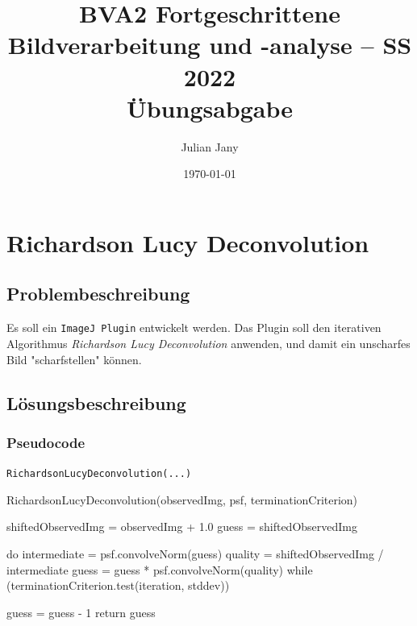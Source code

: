 \documentclass[german,notitlepage,smartquotes]{hgbreport}
\author{Julian Jany}                        %
\title{BVA2 Fortgeschrittene Bildverarbeitung und -analyse -- SS 2022\\ %
				Übungsabgabe \arabic{chapter}}
\date{\today}
\begin{document}
\maketitle





\section{Richardson Lucy Deconvolution}

\subsection{Problembeschreibung}

Es soll ein \texttt{ImageJ Plugin} entwickelt werden. 
Das Plugin soll den iterativen Algorithmus \textit{Richardson Lucy Deconvolution} anwenden, und damit ein \zB unscharfes Bild "scharfstellen" können.

\subsection{Lösungsbeschreibung}

\subsubsection{Pseudocode}

\begin{program}[h]
\caption{\texttt{RichardsonLucyDeconvolution(...)}}
\label{prog:pseudo}
\begin{GenericCode}
RichardsonLucyDeconvolution(observedImg, psf, terminationCriterion) {
	shiftedObservedImg = observedImg + 1.0
	guess = shiftedObservedImg

	do {
		intermediate = psf.convolveNorm(guess)
		quality = shiftedObservedImg / intermediate
		guess = guess * psf.convolveNorm(quality)
	} while (terminationCriterion.test(iteration, stddev))

	guess = guess - 1
	return guess
}
\end{GenericCode}
\end{program}
\end{document}
